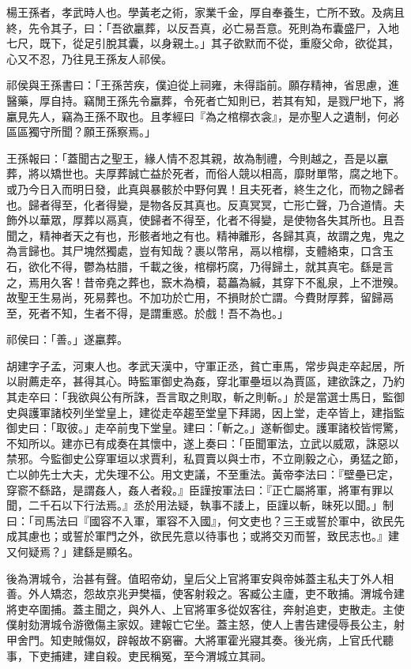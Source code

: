 
\begin{pinyinscope}
楊王孫者，孝武時人也。學黃老之術，家業千金，厚自奉養生，亡所不致。及病且終，先令其子，曰：「吾欲臝葬，以反吾真，必亡易吾意。死則為布囊盛尸，入地七尺，既下，從足引脫其囊，以身親土。」其子欲默而不從，重廢父命，欲從其，心又不忍，乃往見王孫友人祁侯。

祁侯與王孫書曰：「王孫苦疾，僕迫從上祠雍，未得詣前。願存精神，省思慮，進醫藥，厚自持。竊閒王孫先令臝葬，令死者亡知則已，若其有知，是戮尸地下，將臝見先人，竊為王孫不取也。且孝經曰『為之棺槨衣衾』，是亦聖人之遺制，何必區區獨守所聞？願王孫察焉。」

王孫報曰：「蓋聞古之聖王，緣人情不忍其親，故為制禮，今則越之，吾是以臝葬，將以矯世也。夫厚葬誠亡益於死者，而俗人競以相高，靡財單幣，腐之地下。或乃今日入而明日發，此真與暴骸於中野何異！且夫死者，終生之化，而物之歸者也。歸者得至，化者得變，是物各反其真也。反真冥冥，亡形亡聲，乃合道情。夫飾外以華眾，厚葬以鬲真，使歸者不得至，化者不得變，是使物各失其所也。且吾聞之，精神者天之有也，形骸者地之有也。精神離形，各歸其真，故謂之鬼，鬼之為言歸也。其尸塊然獨處，豈有知哉？裹以幣帛，鬲以棺槨，支體絡束，口含玉石，欲化不得，鬱為枯腊，千載之後，棺槨朽腐，乃得歸土，就其真宅。繇是言之，焉用久客！昔帝堯之葬也，窾木為櫝，葛藟為緘，其穿下不亂泉，上不泄殠。故聖王生易尚，死易葬也。不加功於亡用，不損財於亡謂。今費財厚葬，留歸鬲至，死者不知，生者不得，是謂重惑。於戲！吾不為也。」

祁侯曰：「善。」遂臝葬。

胡建字子孟，河東人也。孝武天漢中，守軍正丞，貧亡車馬，常步與走卒起居，所以尉薦走卒，甚得其心。時監軍御史為姦，穿北軍壘垣以為賈區，建欲誅之，乃約其走卒曰：「我欲與公有所誅，吾言取之則取，斬之則斬。」於是當選士馬日，監御史與護軍諸校列坐堂皇上，建從走卒趨至堂皇下拜謁，因上堂，走卒皆上，建指監御史曰：「取彼。」走卒前曳下堂皇。建曰：「斬之。」遂斬御史。護軍諸校皆愕驚，不知所以。建亦已有成奏在其懷中，遂上奏曰：「臣聞軍法，立武以威眾，誅惡以禁邪。今監御史公穿軍垣以求賈利，私買賣以與士巿，不立剛毅之心，勇猛之節，亡以帥先士大夫，尤失理不公。用文吏議，不至重法。黃帝李法曰：『壁壘已定，穿窬不繇路，是謂姦人，姦人者殺。』臣謹按軍法曰：『正亡屬將軍，將軍有罪以聞，二千石以下行法焉。』丞於用法疑，執事不諉上，臣謹以斬，昧死以聞。」制曰：「司馬法曰『國容不入軍，軍容不入國』，何文吏也？三王或誓於軍中，欲民先成其慮也；或誓於軍門之外，欲民先意以待事也；或將交刃而誓，致民志也。』建又何疑焉？」建繇是顯名。

後為渭城令，治甚有聲。值昭帝幼，皇后父上官將軍安與帝姊蓋主私夫丁外人相善。外人矯恣，怨故京兆尹樊福，使客射殺之。客臧公主廬，吏不敢捕。渭城令建將吏卒圍捕。蓋主聞之，與外人、上官將軍多從奴客往，奔射追吏，吏散走。主使僕射劾渭城令游徼傷主家奴。建報亡它坐。蓋主怒，使人上書告建侵辱長公主，射甲舍門。知吏賊傷奴，辟報故不窮審。大將軍霍光寢其奏。後光病，上官氏代聽事，下吏捕建，建自殺。吏民稱冤，至今渭城立其祠。


\end{pinyinscope}
